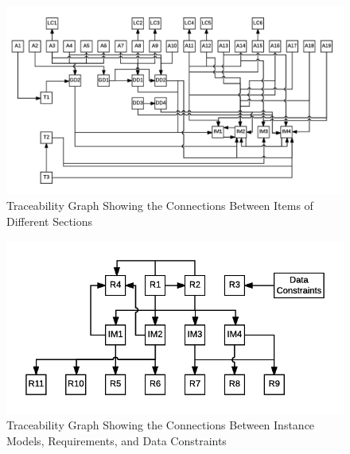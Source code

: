 \documentclass[12pt]{article}
\begin{document}
\begin{figure}
\begin{center}
\includegraphics[width=\textwidth]{../../../datafiles/SWHS/ATrace.png}
\caption{Traceability Graph Showing the Connections Between Items of Different Sections}
\label{Figure:TraceyA}
\end{center}
\end{figure}
\begin{figure}
\begin{center}
\includegraphics[width=\textwidth]{../../../datafiles/SWHS/RTrace.png}
\caption{Traceability Graph Showing the Connections Between Instance Models, Requirements, and Data Constraints}
\label{Figure:TraceyR}
\end{center}
\end{figure}
\end{document}
